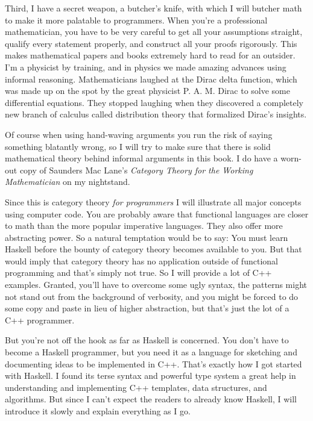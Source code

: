 Third, I have a secret weapon, a butcher's knife, with which I will
butcher math to make it more palatable to programmers. When you're a
professional mathematician, you have to be very careful to get all your
assumptions straight, qualify every statement properly, and construct
all your proofs rigorously. This makes mathematical papers and books
extremely hard to read for an outsider. I'm a physicist by training, and
in physics we made amazing advances using informal reasoning.
Mathematicians laughed at the Dirac delta function, which was made up on
the spot by the great physicist P. A. M. Dirac to solve some
differential equations. They stopped laughing when they discovered a
completely new branch of calculus called distribution theory that
formalized Dirac's insights.

Of course when using hand-waving arguments you run the risk of saying
something blatantly wrong, so I will try to make sure that there is
solid mathematical theory behind informal arguments in this book. I do
have a worn-out copy of Saunders Mac Lane's \emph{Category Theory for
the Working Mathematician} on my nightstand.

Since this is category theory \emph{for programmers} I will illustrate
all major concepts using computer code. You are probably aware that
functional languages are closer to math than the more popular imperative
languages. They also offer more abstracting power. So a natural
temptation would be to say: You must learn Haskell before the bounty of
category theory becomes available to you. But that would imply that
category theory has no application outside of functional programming and
that's simply not true. So I will provide a lot of C++ examples.
Granted, you'll have to overcome some ugly syntax, the patterns might
not stand out from the background of verbosity, and you might be forced
to do some copy and paste in lieu of higher abstraction, but that's just
the lot of a C++ programmer.

But you're not off the hook as far as Haskell is concerned. You don't
have to become a Haskell programmer, but you need it as a language for
sketching and documenting ideas to be implemented in C++. That's exactly
how I got started with Haskell. I found its terse syntax and powerful
type system a great help in understanding and implementing C++
templates, data structures, and algorithms. But since I can't expect the
readers to already know Haskell, I will introduce it slowly and explain
everything as I go.

